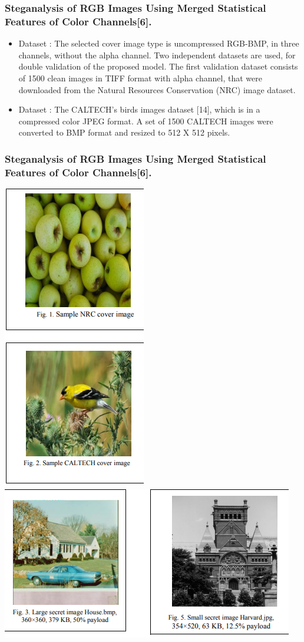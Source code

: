\documentclass{beamer} %
\theoremstyle{definition} %
\begin{document}
\begin{frame}
\frametitle{Steganalysis of RGB Images Using Merged Statistical Features of Color Channels[6].}
\begin{itemize}
	\item Dataset :  The selected cover image type is uncompressed RGB-BMP, in three channels, without the alpha channel. Two independent datasets are used, for double validation of the proposed model. The first validation dataset consists of 1500 clean images in TIFF format with alpha channel, that were downloaded from the Natural Resources Conservation (NRC) image dataset.
	\item Dataset : The CALTECH’s birds images dataset [14], which is in a compressed color JPEG format. A set of 1500 CALTECH images were converted to BMP format and resized to 512 X 512 pixels. 
\end{itemize}
\end{frame}
\begin{frame}
\frametitle{Steganalysis of RGB Images Using Merged Statistical Features of Color Channels[6].}
\includegraphics[scale=0.35]{nrcndcaltech.png}
\includegraphics[scale=0.35]{stegImage.png}
\end{frame}
\end{document}
